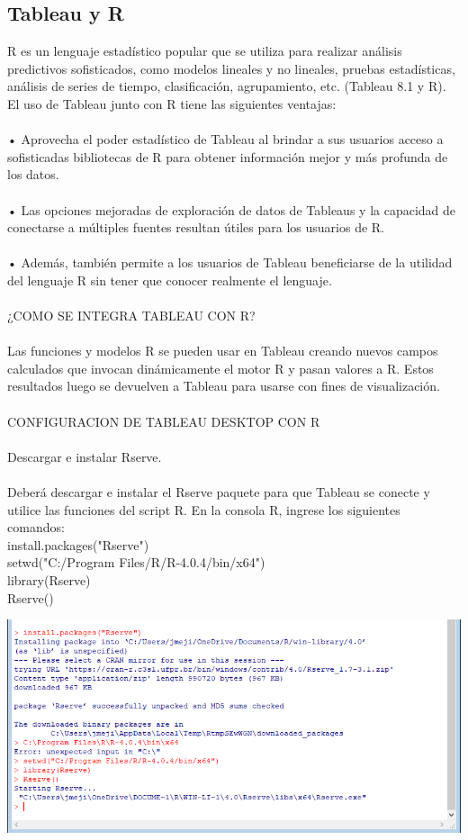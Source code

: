 \documentclass[12pt,letterpaper]{article}
\begin{document}
\subsection{Tableau y R}
R es un lenguaje estadístico popular que se utiliza para realizar análisis predictivos sofisticados, como
modelos lineales y no lineales, pruebas estadísticas, análisis de series de tiempo, clasificación,
agrupamiento, etc. (Tableau 8.1 y R). El uso de Tableau junto con R tiene las siguientes ventajas:
\\\\• Aprovecha el poder estadístico de Tableau al brindar a sus usuarios acceso a sofisticadas
bibliotecas de R para obtener información mejor y más profunda de los datos.
\\\\• Las opciones mejoradas de exploración de datos de Tableaus y la capacidad de conectarse a
múltiples fuentes resultan útiles para los usuarios de R.
\\\\• Además, también permite a los usuarios de Tableau beneficiarse de la utilidad del lenguaje R
sin tener que conocer realmente el lenguaje.
\\\\¿COMO SE INTEGRA TABLEAU CON R?
\\\\Las funciones y modelos R se pueden usar en Tableau creando nuevos campos calculados que invocan
dinámicamente el motor R y pasan valores a R. Estos resultados luego se devuelven a Tableau para
usarse con fines de visualización.
\\\\CONFIGURACION DE TABLEAU DESKTOP CON R
\\\\Descargar e instalar Rserve.
\\\\Deberá descargar e instalar el Rserve paquete para que Tableau se conecte y utilice las funciones del
script R. En la consola R, ingrese los siguientes comandos:
\\install.packages("Rserve")
\\setwd("C:/Program Files/R/R-4.0.4/bin/x64")
\\library(Rserve)
\\Rserve()
\begin{center}
    \includegraphics[width=16cm]{img/72.png}  
\end{center}
\end{document}
